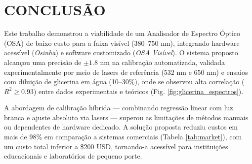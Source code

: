 \documentclass[a4paper]{ifacconf}
\begin{document}


\section{CONCLUSÃO}  
\label{sec:conclusao}  

Este trabalho demonstrou a viabilidade de um Analisador de Espectro Óptico (OSA) de baixo custo para a faixa visível (380–750 nm), integrando hardware acessível (\textit{Osinha}) e software customizado (\textit{OSA Visível}). O sistema proposto alcançou uma precisão de $\pm 1.8$ nm na calibração automatizada, validada experimentalmente por meio de lasers de referência (532 nm e 650 nm) e ensaios com diluição de glicerina em água (10–30\%), onde se observou alta correlação ($R^2 \geq 0.93$) entre dados experimentais e teóricos (Fig. \ref{fig:glicerina_espectros}).  

A abordagem de calibração híbrida — combinando regressão linear com luz branca e ajuste absoluto via lasers — superou as limitações de métodos manuais ou dependentes de hardware dedicado. A solução proposta reduziu custos em mais de 98\% em comparação a sistemas comerciais (Tabela \ref{tab:market}), com um custo total inferior a \$200 USD, tornando-a acessível para instituições educacionais e laboratórios de pequeno porte.  
\end{document}
